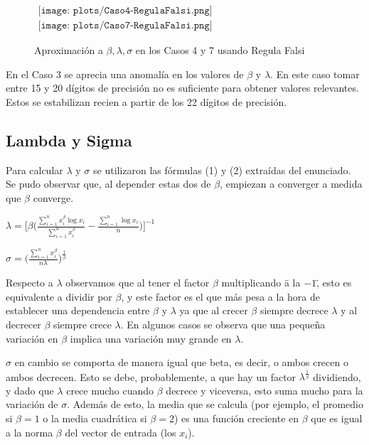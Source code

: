 \begin{figure}
$\begin{array}{c}
\texttt{[image: plots/Caso4-RegulaFalsi.png]} \\
\texttt{[image: plots/Caso7-RegulaFalsi.png]}
\end{array}$

\caption{Aproximaci\'on a $\beta, \lambda, \sigma$ en los Casos 4 y 7 usando 
Regula Falsi}
\end{figure}

En el Caso 3 se aprecia una anomal\'ia en los valores de $\beta$ y $\lambda$.
En este caso tomar entre 15 y 20 d\'igitos de precisi\'on no es suficiente para 
obtener valores relevantes. Estos se estabilizan recien a partir de los 22 
d\'igitos de precisi\'on.

\subsection{Lambda y Sigma}

\indent Para calcular $\lambda$ y $\sigma$ se utilizaron las f\'ormulas 
(1) y (2) extra\'idas del enunciado. Se pudo observar que, al depender estas 
dos de $\beta$, empiezan a converger a medida que $\beta$ converge.
\begin{center}
$\lambda = \big[ \beta \big( \frac{\sum_{i=1}^{n}x_i^\beta \log x_i}{ \sum_{i=1}^{n} x_i^\beta} 
- \frac{\sum_{i=1}^{n} \log x_i}{n} \big)\big]^{-1}$

$\sigma = \big( \frac{\sum_{i=1}^{n} x_i^\beta}{n\lambda}\big)^{\frac{1}{\beta}}$
\end{center}

Respecto a $\lambda$ observamos que al tener el factor $\beta$ multiplicando 
\"a la $-1$\", esto es equivalente a dividir por $\beta$, y este factor es el 
que m\'as pesa a la hora de establecer una dependencia entre $\beta$ y $\lambda$ 
ya que al crecer $\beta$ siempre decrece $\lambda$ y al decrecer $\beta$ siempre
crece $\lambda$. En algunos casos se observa que una peque\~na variaci\'on en 
$\beta$ implica una variaci\'on muy grande en $\lambda$.

$\sigma$ en cambio se comporta de manera igual que beta, es decir, o ambos 
crecen o ambos decrecen. Esto se debe, probablemente, a que hay un factor 
$\lambda^{\frac{1}{\beta}}$ dividiendo, y dado que $\lambda$ crece mucho cuando 
$\beta$ decrece y viceversa, esto suma mucho para la variaci\'on de $\sigma$. 
Adem\'as de esto, la media que se calcula (por ejemplo, el promedio si $\beta = 
1$ o la media cuadr\'atica si $\beta = 2$) es una funci\'on creciente en 
$\beta$ que es igual a la norma $\beta$ del vector de entrada (los $x_i$).

